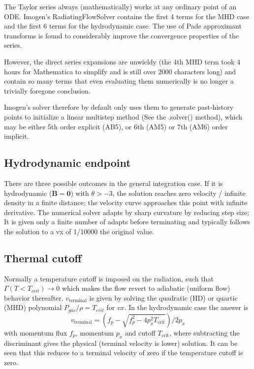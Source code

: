 \documentclass[letterpaper,12pt,twocolumn]{article}
\begin{document}
The Taylor series always (mathematically) works at any ordinary point of an ODE.
Imogen's RadiatingFlowSolver contains the first 4 terms for the MHD case and the first
6 terms for the hydrodynamic case. The use of Pade approximant transforms is found to
considerably improve the convergence properties of the series.

However, the direct series expansions are unwieldy (the 4th MHD term took 4 hours for
Mathematica to simplify and is still over 2000 characters long) and contain so many terms
that even evaluating them numerically is no longer a trivially foregone conclusion.

Imogen's solver therefore by default only uses them to generate past-history points 
to initialize a linear multistep method (See the .solver() method), which may be
either 5th order explicit (AB5), or 6th (AM5) or 7th (AM6) order implicit.

\subsection{Hydrodynamic endpoint}

There are three possible outcomes in the general integration case. If it is 
hydrodynamic ($\mathbf{B} = \mathbf{0}$) with $\theta > -3$, 
the solution reaches zero velocity / infinite density in a finite distance; the
velocity curve approaches this point with infinite derivative. The numerical solver
adapts by sharp curvature by reducing step size; It is given only a finite number of
adapts before terminating and typically follows the solution to a vx of 1/10000 the
original value.

\subsection{Thermal cutoff}

Normally a temperature cutoff is imposed on the radiation, such that
$\Gamma(T < T_{crit}) \rightarrow 0$ which makes the flow revert to adiabatic
(uniform flow) behavior thereafter. $v_{\text{terminal}}$ is given by solving the
quadratic (HD) or quartic (MHD) polynomial $P_{gas}/\rho = T_{crit}$ for $vx$.
In the hydrodynamic case the answer is
\[ v_{\text{terminal}} = (f_p - \sqrt{f_p^2 - 4 p_x^2 T_{\text{crit}} })/ 2 p_x \]
with momentum flux $f_p$, momentum $p_x$ and cutoff $T_{\text{crit}}$, where
subtracting the discriminant gives the physical (terminal velocity is lower)
solution. It can be seen that this reduces to a terminal velocity of zero if 
the temperature cutoff is zero.
\end{document}
